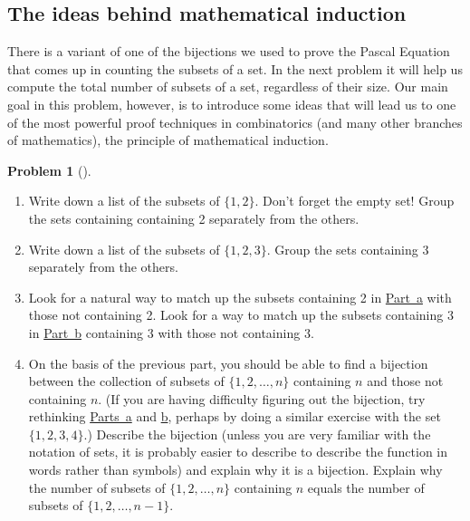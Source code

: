 \documentclass[10pt,]{book}
\theoremstyle{plain}
\theoremstyle{definition}
\newtheorem{activity}[project]{Problem}
\theoremstyle{definition}
\numberwithin{equation}{chapter}
\begin{document}
\subsection[{The ideas behind mathematical induction}]{The ideas behind mathematical induction}\label{subsection-73}
\hypertarget{p-1976}{}%
There is a variant of one of the bijections we used to prove the Pascal Equation that comes up in counting the subsets of a set. In the next problem it will help us compute the total number of subsets of a set, regardless of their size. Our main goal in this problem, however, is to introduce some ideas that will lead us to one of the most powerful proof techniques in combinatorics (and many other branches of mathematics), the principle of mathematical induction.%
\begin{activity}[]\marginsymbol[-1em]{} \label{subsetsbysmallestcounterexample}
\leavevmode%
\begin{enumerate}[font=\bfseries,label=(\alph*),ref=\alph*]
\item\label{subsetsbysmallestcounterexample1} \marginsymbol[-2.5em]{} \hypertarget{p-1977}{}%
Write down a list of the subsets of \(\{1, 2 \}\). Don't forget the empty set! Group the sets containing containing 2 separately from the others.%
\item\label{subsetsbysmallestcounterexample2} \marginsymbol[-2.5em]{} \hypertarget{p-1979}{}%
Write down a list of the subsets of \(\{1, 2, 3 \}\). Group the sets containing 3 separately from the others.%
\item\label{task-256} \marginsymbol[-2.5em]{} \hypertarget{p-1981}{}%
Look for a natural way to match up the subsets containing 2 in \hyperref[subsetsbysmallestcounterexample1]{Part~a} with those not containing 2. Look for a way to match up the subsets containing 3 in \hyperref[subsetsbysmallestcounterexample2]{Part~b} containing 3 with those not containing 3.%
\item\label{task-257} \marginsymbol[-2.5em]{} \hypertarget{p-1983}{}%
On the basis of the previous part, you should be able to find a bijection between the collection of subsets of \(\{1, 2, \ldots , n \}\) containing \(n\) and those not containing \(n\). (If you are having difficulty figuring out the bijection, try rethinking \hyperref[subsetsbysmallestcounterexample1]{Parts~a} and \hyperref[subsetsbysmallestcounterexample2]{b}, perhaps by doing a similar exercise with the set \(\{1,2,3,4\}\).) Describe the bijection (unless you are very familiar with the notation of sets, it is probably easier to describe to describe the function in words rather than symbols) and explain why it is a bijection. Explain why the number of subsets of \(\{1, 2, \ldots , n \}\) containing \(n\) equals the number of subsets of \(\{1, 2, \ldots, n-1 \}\).%

\end{enumerate}
\end{activity}
\end{document}
